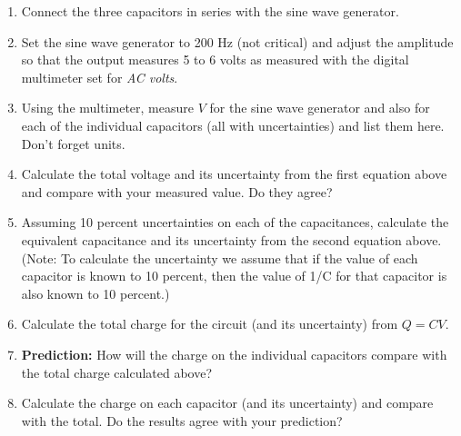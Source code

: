 \begin{enumerate}
\item Connect the three capacitors in series with the sine wave generator.
\item Set the sine wave generator to 200 Hz (not critical) and adjust the
amplitude so that the output measures 5 to 6 volts as measured with the
digital multimeter set for \textit{AC volts}.
\item Using the multimeter, measure $V$ for the sine wave generator and also
for each of the individual capacitors (all with uncertainties) and
list them here. Don't forget units.\vspace{20mm}

\item Calculate the total voltage and its uncertainty from the first equation
above and compare with your measured value.  Do they agree?\vspace{30mm}

\item Assuming 10 percent uncertainties on each of the capacitances,
calculate the equivalent capacitance and its uncertainty from the second
equation above. (Note: To calculate the uncertainty we assume that if the value
 of each capacitor is known to 10 percent, then the value of 1/C for 
that capacitor is also known to 10 percent.) \vspace{45mm}

\item Calculate the total charge for the circuit (and its uncertainty) from
$Q = CV$.\vspace{30mm}

\item \textbf{Prediction:} How will the charge on the individual capacitors
compare with the total charge calculated above?\vspace{15mm}

\item Calculate the charge on each capacitor (and its uncertainty) and compare 
with the total. Do the results agree with your prediction?
\end{enumerate}
